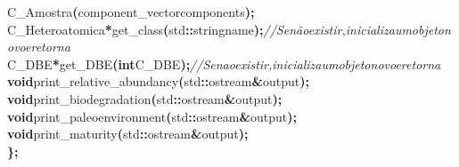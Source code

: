 \documentclass[a4paper, 11pt]{article}
\newcommand\SPC{\hspace*{0.6em}}
\newcommand{\CppAComment}[1]{\textit{\textcolor[rgb]{0.2,0.6,1}{#1}}}
\newcommand{\CppAIdentifier}[1]{#1}
\newcommand{\CppAReservedWord}[1]{\textbf{#1}}
\newcommand{\CppASpace}[1]{\colorbox[rgb]{1,1,1}{#1}}
\newcommand{\CppASymbol}[1]{\textbf{\textcolor[rgb]{1,0,0}{#1}}}
\begin{document}
\begin{ttfamily}
\CppASpace{\SPC \SPC \SPC \SPC \SPC \SPC \SPC \SPC \SPC \SPC \SPC \SPC }\CppAIdentifier{C\_Amostra}\CppASymbol{(}\CppAIdentifier{component\_vector}\CppASpace{\SPC }\CppAIdentifier{components}\CppASymbol{)}\CppASymbol{;}\\
\CppASpace{\SPC \SPC \SPC \SPC \SPC \SPC \SPC \SPC \SPC \SPC \SPC \SPC }\CppAIdentifier{C\_Heteroatomica}\CppASpace{\SPC }\CppASymbol{*}\CppAIdentifier{get\_class}\CppASymbol{(}\CppAIdentifier{std}\CppASymbol{::}\CppAIdentifier{string}\CppASpace{\SPC }\CppAIdentifier{name}\CppASymbol{)}\CppASymbol{;}\CppASpace{\SPC }\CppAComment{//\SPC Se\SPC não\SPC existir,\SPC inicializa\SPC um\SPC objeto\SPC novo\SPC e\SPC retorna}\\
\CppASpace{\SPC \SPC \SPC \SPC \SPC \SPC \SPC \SPC \SPC \SPC \SPC \SPC }\CppAIdentifier{C\_DBE}\CppASpace{\SPC }\CppASymbol{*}\CppAIdentifier{get\_DBE}\CppASymbol{(}\CppAReservedWord{int}\CppASpace{\SPC }\CppAIdentifier{C\_DBE}\CppASymbol{)}\CppASymbol{;}\CppASpace{\SPC }\CppAComment{//\SPC Se\SPC nao\SPC existir,\SPC inicializa\SPC um\SPC objeto\SPC novo\SPC e\SPC retorna}\\
\CppASpace{\SPC \SPC \SPC \SPC \SPC \SPC \SPC \SPC \SPC \SPC \SPC \SPC }\CppAReservedWord{void}\CppASpace{\SPC }\CppAIdentifier{print\_relative\_abundancy}\CppASymbol{(}\CppAIdentifier{std}\CppASymbol{::}\CppAIdentifier{ostream}\CppASpace{\SPC }\CppASymbol{\&}\CppAIdentifier{output}\CppASymbol{)}\CppASymbol{;}\\
\CppASpace{\SPC \SPC \SPC \SPC \SPC \SPC \SPC \SPC \SPC \SPC \SPC \SPC }\CppAReservedWord{void}\CppASpace{\SPC }\CppAIdentifier{print\_biodegradation}\CppASymbol{(}\CppAIdentifier{std}\CppASymbol{::}\CppAIdentifier{ostream}\CppASpace{\SPC }\CppASymbol{\&}\CppAIdentifier{output}\CppASymbol{)}\CppASymbol{;}\\
\CppASpace{\SPC \SPC \SPC \SPC \SPC \SPC \SPC \SPC \SPC \SPC \SPC \SPC }\CppAReservedWord{void}\CppASpace{\SPC }\CppAIdentifier{print\_paleoenvironment}\CppASymbol{(}\CppAIdentifier{std}\CppASymbol{::}\CppAIdentifier{ostream}\CppASpace{\SPC }\CppASymbol{\&}\CppAIdentifier{output}\CppASymbol{)}\CppASymbol{;}\\
\CppASpace{\SPC \SPC \SPC \SPC \SPC \SPC \SPC \SPC \SPC \SPC \SPC \SPC }\CppAReservedWord{void}\CppASpace{\SPC }\CppAIdentifier{print\_maturity}\CppASymbol{(}\CppAIdentifier{std}\CppASymbol{::}\CppAIdentifier{ostream}\CppASpace{\SPC }\CppASymbol{\&}\CppAIdentifier{output}\CppASymbol{)}\CppASymbol{;}\\
\CppASpace{\SPC \SPC \SPC \SPC }\CppASymbol{\}}\CppASymbol{;}\\

\end{ttfamily}
\end{document}
